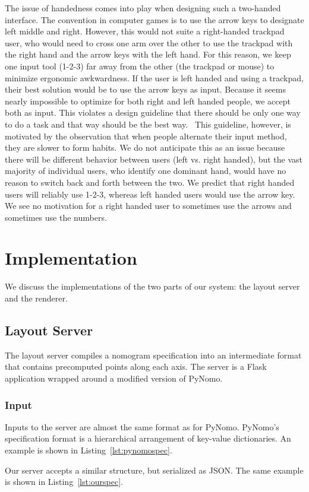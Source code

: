 \documentclass{proc}
\begin{document}
The issue of handedness comes into play when designing such a
two-handed interface. The convention in computer games is to use the
arrow keys to designate left middle and right. However, this would not
suite a right-handed trackpad user, who would need to cross one arm
over the other to use the trackpad with the right hand and the arrow
keys with the left hand. For this reason, we keep one input tool
(1-2-3) far away from the other (the trackpad or mouse) to minimize
ergonomic awkwardness. If the user is left handed and using a
trackpad, their best solution would be to use the arrow keys as input.
Because it seems nearly impossible to optimize for both right and left
handed people, we accept both as input. This violates a design
guideline that there should be only one way to do a task and that way
should be the best way.~\cite{raskin} This guideline, however, is
motivated by the observation that when people alternate their input
method, they are slower to form habits. We do not anticipate this as
an issue because there will be different behavior between users (left
vs. right handed), but the vast majority of individual users, who
identify one dominant hand, would have no reason to switch back and
forth between the two. We predict that right handed users will
reliably use 1-2-3, whereas left handed users would use the arrow key.
We see no motivation for a right handed user to sometimes use the
arrows and sometimes use the numbers.

\section{Implementation}
We discuss the implementations of the two parts of our system: the
layout server and the renderer.

\subsection{Layout Server}
The layout server compiles a nomogram specification into an
intermediate format that contains precomputed points along each axis.
The server is a Flask~\cite{flask} application wrapped around a
modified version of PyNomo.

\subsubsection{Input}
Inputs to the server are almost the same format as for PyNomo.
PyNomo's specification format is a hierarchical arrangement of
key-value dictionaries.
An example is shown in Listing~\ref{lst:pynomospec}.

Our server accepts a similar structure, but serialized as JSON.
The same example is shown in Listing~\ref{lst:ourspec}.

\end{document}
